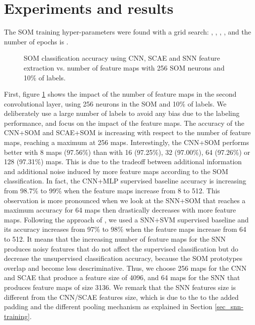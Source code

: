 \documentclass[runningheads]{llncs}
\begin{document}
\section{Experiments and results}
\label{sec_results}
The SOM training hyper-parameters were found with a grid search: , , , ,  and the number of epochs is .

\begin{figure}[h!]
	\centerline{}
	\caption{SOM classification accuracy using CNN, SCAE and SNN feature extraction vs. number of feature maps with 256 SOM neurons and 10\% of labels.}
	\label{fig_deepsom-maps}
\end{figure}

First, figure \ref{fig_deepsom-maps} shows the impact of the number of feature maps in the second convolutional layer, using 256 neurons in the SOM and 10\% of labels. We deliberately use a large number of labels to avoid any bias due to the labeling performance, and focus on the impact of the feature maps. The accuracy of the CNN+SOM and SCAE+SOM is increasing with respect to the number of feature maps, reaching a maximum at 256 maps.
Interestingly, the CNN+SOM performs better with 8 maps (97.56\%) than with 16 (97.25\%), 32 (97.00\%), 64 (97.26\%) or 128 (97.31\%) maps. This is due to the tradeoff between additional information and additional noise induced by more feature maps according to the SOM classification. In fact, the CNN+MLP supervised baseline accuracy is increasing from 98.7\% to 99\% when the feature maps increase from 8 to 512. 
This observation is more pronounced when we look at the SNN+SOM that reaches a maximum accuracy for 64 maps then drastically decreases with more feature maps. Following the approach of \cite{kheradpisheh2018stdp_cnn}, we used a SNN+SVM supervised baseline and its accuracy increases from 97\% to 98\% when the feature maps increase from 64 to 512. It means that the increasing number of feature maps for the SNN produces noisy features that do not affect the supervised classification but do decrease the unsupervised classification accuracy, because the SOM prototypes overlap and become less descriminative. 
Thus, we choose 256 maps for the CNN and SCAE that produce a feature size of 4096, and 64 maps for the SNN that produces feature maps of size 3136. We remark that the SNN features size is different from the CNN/SCAE features size, which is due to the to the added padding and the different pooling mechanism as explained in Section \ref{sec_snn-training}.
\end{document}
